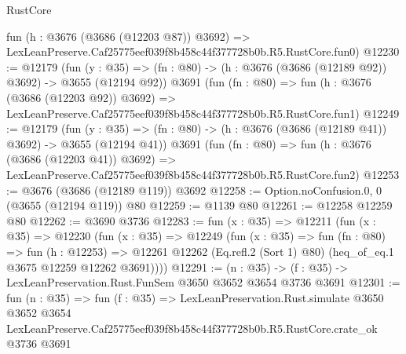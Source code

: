 \begin{lexlean}{RustCore}
\begin{coremodule}
    fun (h : @3676 (@3686 (@12203 @87)) @3692) =>
    LexLeanPreserve.Caf25775eef039f8b458c44f377728b0b.R5.RustCore.fun0)
@12230 := @12179
    (fun (y : @35) => (fn : @80) -> (h : @3676 (@3686 (@12189 @92)) @3692) -> @3655 (@12194 @92))
    @3691
    (fun (fn : @80) =>
    fun (h : @3676 (@3686 (@12203 @92)) @3692) =>
    LexLeanPreserve.Caf25775eef039f8b458c44f377728b0b.R5.RustCore.fun1)
@12249 := @12179
    (fun (y : @35) => (fn : @80) -> (h : @3676 (@3686 (@12189 @41)) @3692) -> @3655 (@12194 @41))
    @3691
    (fun (fn : @80) =>
    fun (h : @3676 (@3686 (@12203 @41)) @3692) =>
    LexLeanPreserve.Caf25775eef039f8b458c44f377728b0b.R5.RustCore.fun2)
@12253 := @3676 (@3686 (@12189 @119)) @3692
@12258 := Option.noConfusion.{0, 0} (@3655 (@12194 @119)) @80
@12259 := @1139 @80
@12261 := @12258 @12259 @80
@12262 := @3690 @3736
@12283 := fun (x : @35) =>
  @12211
    (fun (x : @35) =>
    @12230
      (fun (x : @35) =>
      @12249
        (fun (x : @35) =>
        fun (fn : @80) =>
        fun (h : @12253) =>
        @12261 @12262 (Eq.refl.{2} (Sort 1) @80) (heq_of_eq.{1} @3675 @12259 @12262 @3691))))
@12291 := (n : @35) -> (f : @35) -> LexLeanPreservation.Rust.FunSem @3650 @3652 @3654 @3736 @3691
@12301 := fun (n : @35) =>
  fun (f : @35) =>
  LexLeanPreservation.Rust.simulate
    @3650
    @3652
    @3654
    LexLeanPreserve.Caf25775eef039f8b458c44f377728b0b.R5.RustCore.crate_ok
    @3736
    @3691
\end{coremodule}
\end{lexlean}
